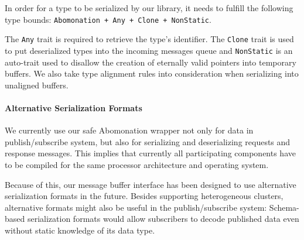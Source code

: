 In order for a type to be serialized by our library, it needs to fulfill the
following type bounds: \lstinline{Abomonation + Any + Clone + NonStatic}.

The \lstinline{Any} trait is required to retrieve the type's identifier. The
\lstinline{Clone} trait is used to put deserialized types into the incoming
messages queue and \lstinline{NonStatic} is an auto-trait used to disallow the
creation of eternally valid pointers into temporary buffers. We also take type
alignment rules into consideration when serializing into unaligned buffers. 

\paragraph{Alternative Serialization Formats}

We currently use our safe Abomonation wrapper not only for data in
publish/subscribe system, but also for serializing and deserializing requests
and response messages. This implies that currently all participating components
have to be compiled for the same processor architecture and operating system.

Because of this, our message buffer interface has been designed to use alternative
serialization formats in the future. Besides supporting heterogeneous clusters,
alternative formats might also be useful in the publish/subscribe system:
Schema-based serialization formats would allow subscribers to decode published
data even without static knowledge of its data type.

